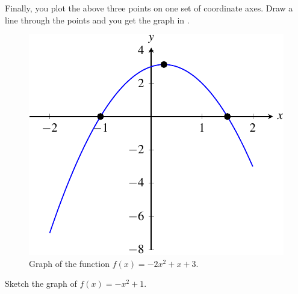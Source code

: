 \documentclass[a4paper,oneside,12pt]{article}
\begin{document}
{\begin{solution}
Finally, you plot the above three points on one set of coordinate
axes.  Draw a line through the points and you get the graph in
.

\begin{figure}[!htbp]
\centering
\includegraphics[scale=1]{image/07/aminus2-b1-c3.pdf}
\caption{%
  Graph of the function $f(x) = -2x^2 + x + 3$.
}
\label{fig:aminus2_b1_c3}
\end{figure}
\end{solution}
}{}

\begin{exercise}
Sketch the graph of $f(x) = -x^2 + 1$.
\end{exercise}
\end{document}
